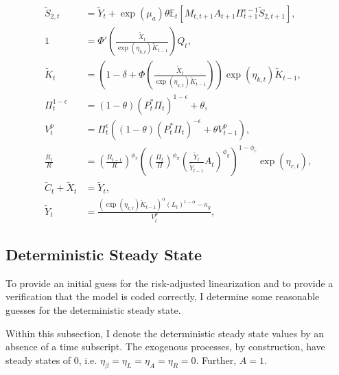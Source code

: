 \documentclass[12 pt, oneside]{article}
\theoremstyle{definition}
\theoremstyle{definition}
\theoremstyle{definition}
\newcommand{\E}{\mathbb{E}}
\begin{document}
\begin{align}
  \label{eq:denominator recursion eqm stat}
  \tilde{S}_{2, t} & = \tilde{Y}_t + \exp(\mu_a)\theta\E_t[M_{t, t + 1}A_{t + 1}\Pi_{t + 1}^{\epsilon - 1} \tilde{S}_{2, t + 1}],\\
  \label{eq:tobins q}
  1 & = \Phi'\left(\frac{\tilde{X}_t}{\exp(\eta_{k, t})\tilde{K}_{t - 1}}\right) Q_t,\\
  \label{eq:law of motion capital eqm stat}
  \tilde{K}_t & = \left(1 - \delta + \Phi\left(\frac{\tilde{X}_t}{\exp(\eta_{k, t})\tilde{K}_{t - 1}}\right)\right)\exp(\eta_{k, t})\tilde{K}_{t - 1},\\
  \label{eq:inflation from optimal reset price eqm stat}
  \Pi_t^{ 1 - \epsilon} & = (1 - \theta) (P_t^*\Pi_t)^{1 - \epsilon} + \theta,\\
  \label{eq:price dispersion evol eqm stat}
  V_t^p & = \Pi_t^{\epsilon}((1 - \theta) (P_t^* \Pi_t)^{-\epsilon} + \theta V_{t - 1}^p),\\
  \label{eq:taylor rule eqm stat}
  \frac{R_t}{R} & =  \left(\frac{R_{t - 1}}{R}\right)^{\phi_r}\left(\left(\frac{\Pi_t}{\Pi}\right)^{\phi_\pi}\left(\frac{\tilde{Y}_t}{\tilde{Y}_{t - 1}} A_t\right)^{\phi_y}\right)^{1 - \phi_r}\exp(\eta_{r, t}),\\
  \label{eq:output market clearing eqm stat}
  \tilde{C}_t + \tilde{X}_t & = \tilde{Y}_t,\\
  \label{eq:aggregate supply eqm stat}
  \tilde{Y}_t & = \frac{(\exp(\eta_{k, t}) \tilde{K}_{t - 1})^{\alpha}(L_t)^{1 - \alpha} - \kappa_y}{V_t^p},
\end{align}

\subsection{Deterministic Steady State}
To provide an initial guess for the risk-adjusted linearization and to provide a verification that the model is coded correctly, I determine some reasonable guesses for the deterministic steady state.

Within this subsection, I denote the deterministic steady state values by an absence of a time subscript. The exogenous processes, by construction, have steady states of 0, i.e. $\eta_\beta = \eta_L = \eta_A = \eta_R = 0$. Further, $A = 1$.
\end{document}
